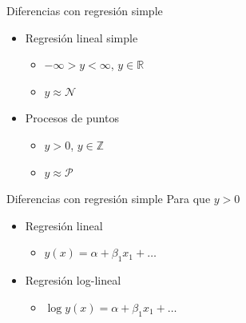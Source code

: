 \documentclass[
  11pt,
  ignorenonframetext,
]{beamer}
\providecommand{\tightlist}{%
  \setlength{\itemsep}{0pt}\setlength{\parskip}{0pt}}
\begin{document}
\begin{frame}{Diferencias con regresión simple}
\protect\hypertarget{diferencias-con-regresiuxf3n-simple}{}
\begin{itemize}
\item
  Regresión lineal simple

  \begin{itemize}
  \tightlist
  \item
    \(-\infty > y < \infty\), \(y \in \mathbb{R}\)
  \item
    \(y \approx \mathcal{N}\)
  \end{itemize}
\item
  Procesos de puntos

  \begin{itemize}
  \tightlist
  \item
    \(y > 0\), \(y \in \mathbb{Z}\)
  \item
    \(y \approx \mathcal{P}\)
  \end{itemize}
\end{itemize}
\end{frame}

\begin{frame}{Diferencias con regresión simple}
\protect\hypertarget{diferencias-con-regresiuxf3n-simple-1}{}
Para que \(y >0\)

\begin{itemize}
\item
  Regresión lineal

  \begin{itemize}
  \tightlist
  \item
    \(y(x) = \alpha + \beta_1 x_1 + \dots\)
  \end{itemize}
\item
  Regresión log-lineal

  \begin{itemize}
  \tightlist
  \item
    \(\log y(x) = \alpha + \beta_1 x_1 + \dots\)
  \end{itemize}
\end{itemize}
\end{frame}
\end{document}
